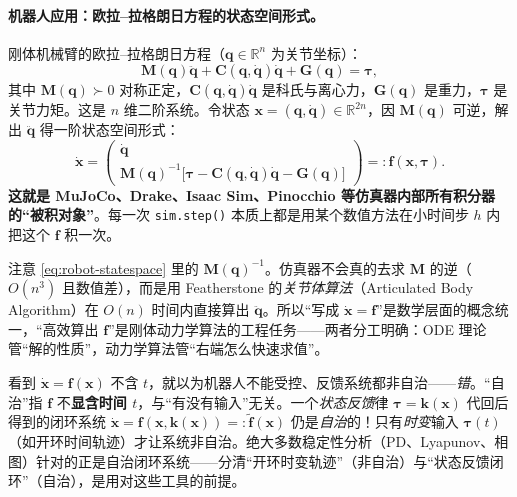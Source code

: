 \paragraph{机器人应用：欧拉--拉格朗日方程的状态空间形式。}
刚体机械臂的欧拉--拉格朗日方程（$\mathbf{q}\in\mathbb{R}^n$ 为关节坐标）：
\begin{equation}
  \mathbf{M}(\mathbf{q})\ddot{\mathbf{q}}+\mathbf{C}(\mathbf{q},\dot{\mathbf{q}})\dot{\mathbf{q}}+\mathbf{G}(\mathbf{q})=\boldsymbol{\tau},
  \label{eq:euler-lagrange}
\end{equation}
其中 $\mathbf{M}(\mathbf{q})\succ0$ 对称正定，$\mathbf{C}(\mathbf{q},\dot{\mathbf{q}})\dot{\mathbf{q}}$ 是科氏与离心力，$\mathbf{G}(\mathbf{q})$ 是重力，$\boldsymbol{\tau}$ 是关节力矩。这是 $n$ 维二阶系统。令状态 $\mathbf{x}=(\mathbf{q},\dot{\mathbf{q}})\in\mathbb{R}^{2n}$，因 $\mathbf{M}(\mathbf{q})$ 可逆，解出 $\ddot{\mathbf{q}}$ 得一阶状态空间形式：
\begin{equation}
  \dot{\mathbf{x}}=\begin{pmatrix}\dot{\mathbf{q}}\\[2pt]\mathbf{M}(\mathbf{q})^{-1}\bigl[\boldsymbol{\tau}-\mathbf{C}(\mathbf{q},\dot{\mathbf{q}})\dot{\mathbf{q}}-\mathbf{G}(\mathbf{q})\bigr]\end{pmatrix}=:\mathbf{f}(\mathbf{x},\boldsymbol{\tau}).
  \label{eq:robot-statespace}
\end{equation}
\textbf{这就是 MuJoCo、Drake、Isaac Sim、Pinocchio 等仿真器内部所有积分器的“被积对象”}。每一次 \texttt{sim.step()} 本质上都是用某个数值方法在小时间步 $h$ 内把这个 $\mathbf{f}$ 积一次。

\begin{insight}
注意 \cref{eq:robot-statespace} 里的 $\mathbf{M}(\mathbf{q})^{-1}$。仿真器不会真的去求 $\mathbf{M}$ 的逆（$O(n^3)$ 且数值差），而是用 Featherstone 的\emph{关节体算法}（Articulated Body Algorithm）在 $O(n)$ 时间内直接算出 $\ddot{\mathbf{q}}$。所以“写成 $\dot{\mathbf{x}}=\mathbf{f}$”是数学层面的概念统一，“高效算出 $\mathbf{f}$”是刚体动力学算法的工程任务——两者分工明确：ODE 理论管“解的性质”，动力学算法管“右端怎么快速求值”。
\end{insight}

\begin{pitfall}
看到 $\dot{\mathbf{x}}=\mathbf{f}(\mathbf{x})$ 不含 $t$，就以为机器人不能受控、反馈系统都非自治——\emph{错}。“自治”指 $\mathbf{f}$ 不\textbf{显含时间 $t$}，与“有没有输入”无关。一个\emph{状态反馈}律 $\boldsymbol{\tau}=\mathbf{k}(\mathbf{x})$ 代回后得到的闭环系统 $\dot{\mathbf{x}}=\mathbf{f}(\mathbf{x},\mathbf{k}(\mathbf{x}))=:\tilde{\mathbf{f}}(\mathbf{x})$ 仍是\emph{自治}的！只有\emph{时变}输入 $\boldsymbol{\tau}(t)$（如开环时间轨迹）才让系统非自治。绝大多数稳定性分析（PD、Lyapunov、相图）针对的正是自治闭环系统——分清“开环时变轨迹”（非自治）与“状态反馈闭环”（自治），是用对这些工具的前提。
\end{pitfall}

